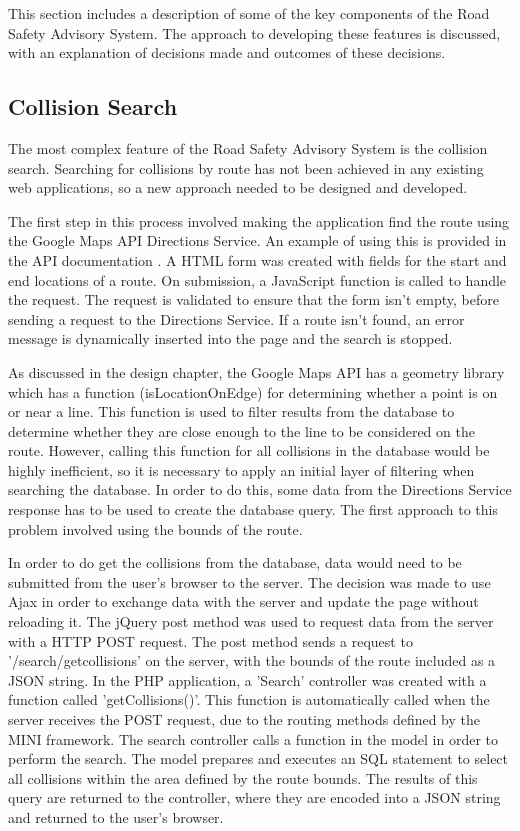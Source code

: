 \documentclass[authoryearcitations]{UoYCSproject}
\begin{document}
This section includes a description of some of the key components of the Road Safety Advisory System. The approach to developing these features is discussed, with an explanation of decisions made and outcomes of these decisions. 

\subsection{Collision Search}

The most complex feature of the Road Safety Advisory System is the collision search. Searching for collisions by route has not been achieved in any existing web applications, so a new approach needed to be designed and developed. 

The first step in this process involved making the application find the route using the Google Maps API Directions Service. An example of using this is provided in the API documentation \citep{Google}. A HTML form was created with fields for the start and end locations of a route. On submission, a JavaScript function is called to handle the request. The request is validated to ensure that the form isn't empty, before sending a request to the Directions Service. If a route isn't found, an error message is dynamically inserted into the page and the search is stopped. 

As discussed in the design chapter, the Google Maps API has a geometry library which has a function (isLocationOnEdge) for determining whether a point is on or near a line. This function is used to filter results from the database to determine whether they are close enough to the line to be considered on the route. However, calling this function for all collisions in the database would be highly inefficient, so it is necessary to apply an initial layer of filtering when searching the database. In order to do this, some data from the Directions Service response has to be used to create the database query. The first approach to this problem involved using the bounds of the route. 

In order to do get the collisions from the database, data would need to be submitted from the user's browser to the server. The decision was made to use Ajax in order to exchange data with the server and update the page without reloading it. The jQuery \citep{ThejQueryFoundation} post method was used to request data from the server with a HTTP POST request. The post method sends a request to '/search/getcollisions' on the server, with the bounds of the route included as a JSON string. In the PHP application, a 'Search' controller was created with a function called 'getCollisions()'. This function is automatically called when the server receives the POST request, due to the routing methods defined by the MINI framework. The search controller calls a function in the model in order to perform the search. The model prepares and executes an SQL statement to select all collisions within the area defined by the route bounds. The results of this query are returned to the controller, where they are encoded into a JSON string and returned to the user's browser.
\end{document}
